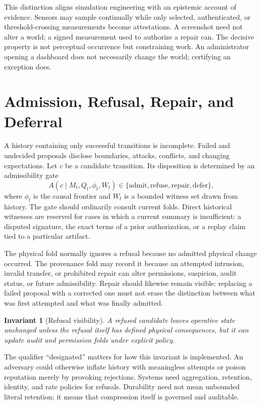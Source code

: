 \documentclass[11pt]{article}
\newtheorem{invariant}{Invariant}
\begin{document}
This distinction aligns simulation engineering with an epistemic account of evidence. Sensors may sample continually while only selected, authenticated, or threshold-crossing measurements become attestations. A screenshot need not alter a world; a signed measurement used to authorize a repair can. The decisive property is not perceptual occurrence but constraining work. An administrator opening a dashboard does not necessarily change the world; certifying an exception does.

\section{Admission, Refusal, Repair, and Deferral}
\label{sec:admission}

A history containing only successful transitions is incomplete. Failed and undecided proposals disclose boundaries, attacks, conflicts, and changing expectations. Let $c$ be a candidate transition. Its disposition is determined by an admissibility gate
\[
A(c \mid M_t, Q_t, \phi_t, W_t) \in \{\text{admit}, \text{refuse}, \text{repair}, \text{defer}\},
\]
where $\phi_t$ is the causal frontier and $W_t$ is a bounded witness set drawn from history. The gate should ordinarily consult current folds. Direct historical witnesses are reserved for cases in which a current summary is insufficient: a disputed signature, the exact terms of a prior authorization, or a replay claim tied to a particular artifact.

The physical fold normally ignores a refusal because no admitted physical change occurred. The provenance fold may record it because an attempted intrusion, invalid transfer, or prohibited repair can alter permissions, suspicion, audit status, or future admissibility. Repair should likewise remain visible: replacing a failed proposal with a corrected one must not erase the distinction between what was first attempted and what was finally admitted.

\begin{invariant}[Refusal visibility]
\label{inv:refusal}
A refused candidate leaves operative state unchanged unless the refusal itself has defined physical consequences, but it can update audit and permission folds under explicit policy.
\end{invariant}

The qualifier ``designated'' matters for how this invariant is implemented. An adversary could otherwise inflate history with meaningless attempts or poison reputation merely by provoking rejections. Systems need aggregation, retention, identity, and rate policies for refusals. Durability need not mean unbounded literal retention; it means that compression itself is governed and auditable.
\end{document}
